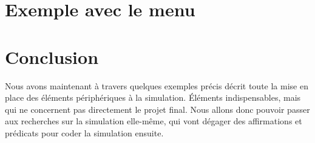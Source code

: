\section{Exemple avec le menu}
  
  
\section*{Conclusion}
  Nous avons maintenant à travers quelques exemples précis décrit toute la mise en place des éléments périphériques à la simulation. Éléments indispensables, mais qui ne concernent pas directement le projet final. Nous allons donc pouvoir passer aux recherches sur la simulation elle-même, qui vont dégager des affirmations et prédicats pour coder la simulation ensuite.

    
     

